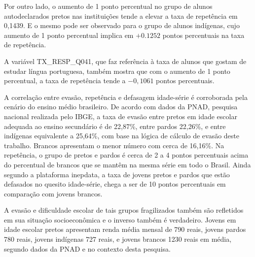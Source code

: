 \documentclass[english, spanish, brazilian]{RBIEarticle} %
\begin{document}
Por outro lado, o aumento de 1 ponto percentual no grupo de alunos autodeclarados pretos nas instituições tende a elevar a taxa de repetência em 0,1439. E o mesmo pode ser observado para o grupo de alunos indígenas, cujo aumento de 1 ponto percentual implica em $+0.1252$ pontos percentuais na taxa de repetência.

A variável TX\_RESP\_Q041, que faz referência à taxa de alunos que gostam de estudar língua portuguesa, também mostra que com o aumento de 1 ponto percentual, a taxa de repetência tende a $-0,1061$ pontos percentuais.

A correlação entre evasão, repetência e defasagem idade-série é corroborada pela cenário do ensino médio brasileiro. De acordo com dados da PNAD, pesquisa nacional realizada pelo IBGE, a taxa de evasão entre pretos em idade escolar adequada ao ensino secundário é de 22,87\%, entre pardos 22,26\%, e entre indígenas equivalente a 25,64\%, com base na lógica de cálculo de evasão deste trabalho. Brancos apresentam o menor número com cerca de 16,16\%. Na repetência, o grupo de pretos e pardos é cerca de 2 a 4 pontos percentuais acima do percentual de brancos que se mantêm na mesma série em todo o Brasil. Ainda segundo a plataforma inepdata, a taxa de jovens pretos e pardos que estão defasados no quesito idade-série, chega a ser de 10 pontos percentuais em comparação com jovens brancos.

A evasão e dificuldade escolar de tais grupos fragilizados também são refletidos em sua situação socioeconômica e o inverso também é verdadeiro. Jovens em idade escolar pretos apresentam renda média mensal de 790 reais, jovens pardos 780 reais, jovens indígenas 727 reais, e jovens brancos 1230 reais em média, segundo dados da PNAD e no contexto desta pesquisa.









\pagebreak
\nocite{*}
\printbibliography
\end{document}
